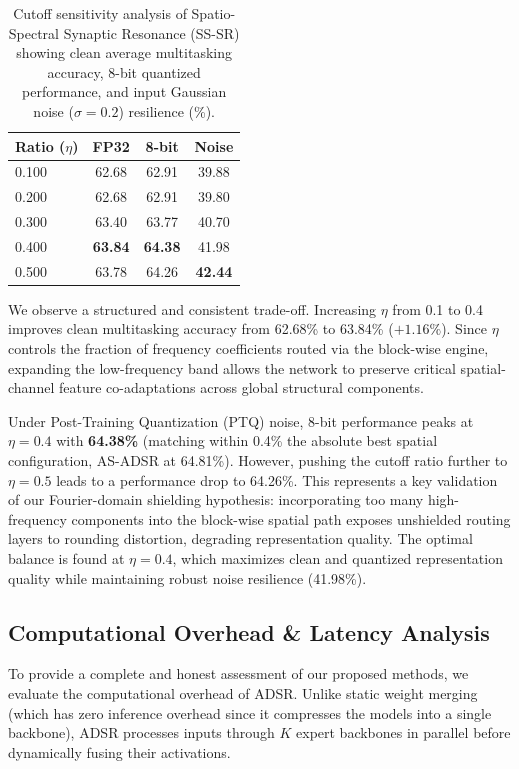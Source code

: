 \documentclass{article}
\theoremstyle{plain}
\theoremstyle{definition}
\theoremstyle{remark}
\begin{document}
\begin{table}[h]
\caption{Cutoff sensitivity analysis of Spatio-Spectral Synaptic Resonance (SS-SR) showing clean average multitasking accuracy, 8-bit quantized performance, and input Gaussian noise ($\sigma = 0.2$) resilience (\%).}
\label{tab:spectral_cutoff}
\vskip 0.15in
\begin{center}
\begin{small}
\begin{sc}
\setlength{\tabcolsep}{6.0pt}
\begin{tabular}{lccc}
\toprule
Ratio ($\eta$) & FP32 & 8-bit & Noise \\
\midrule
0.100 & 62.68 & 62.91 & 39.88 \\
0.200 & 62.68 & 62.91 & 39.80 \\
0.300 & 63.40 & 63.77 & 40.70 \\
0.400 & \textbf{63.84} & \textbf{64.38} & 41.98 \\
0.500 & 63.78 & 64.26 & \textbf{42.44} \\
\bottomrule
\end{tabular}
\end{sc}
\end{small}
\end{center}
\vskip -0.1in
\end{table}

We observe a structured and consistent trade-off. Increasing $\eta$ from 0.1 to 0.4 improves clean multitasking accuracy from 62.68\% to 63.84\% ($+1.16\%$). Since $\eta$ controls the fraction of frequency coefficients routed via the block-wise engine, expanding the low-frequency band allows the network to preserve critical spatial-channel feature co-adaptations across global structural components.

Under Post-Training Quantization (PTQ) noise, 8-bit performance peaks at $\eta = 0.4$ with \textbf{64.38\%} (matching within 0.4\% the absolute best spatial configuration, AS-ADSR at 64.81\%). However, pushing the cutoff ratio further to $\eta = 0.5$ leads to a performance drop to 64.26\%. This represents a key validation of our Fourier-domain shielding hypothesis: incorporating too many high-frequency components into the block-wise spatial path exposes unshielded routing layers to rounding distortion, degrading representation quality. The optimal balance is found at $\eta = 0.4$, which maximizes clean and quantized representation quality while maintaining robust noise resilience (41.98\%).

\subsection{Computational Overhead \& Latency Analysis}
To provide a complete and honest assessment of our proposed methods, we evaluate the computational overhead of ADSR. Unlike static weight merging (which has zero inference overhead since it compresses the models into a single backbone), ADSR processes inputs through $K$ expert backbones in parallel before dynamically fusing their activations.
\end{document}
